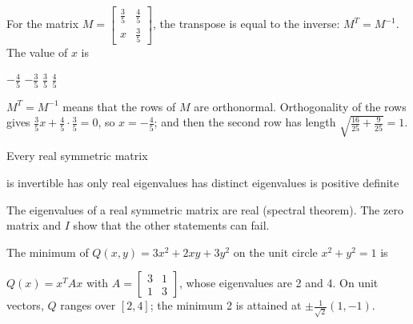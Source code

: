 \begin{question}[id=gate-me2009-1, source=GATE ME 2009]
For the matrix $M = \begin{bmatrix} \frac{3}{5} & \frac{4}{5} \\ x & \frac{3}{5} \end{bmatrix}$, the transpose is equal to the inverse: $M^T = M^{-1}$. The value of $x$ is
\begin{options}
  \correct $-\frac{4}{5}$
  \option $-\frac{3}{5}$
  \option $\frac{3}{5}$
  \option $\frac{4}{5}$
\end{options}
\begin{solution}
$M^T = M^{-1}$ means that the rows of $M$ are orthonormal. Orthogonality of the rows gives $\frac{3}{5}x + \frac{4}{5} \cdot \frac{3}{5} = 0$, so $x = -\frac{4}{5}$; and then the second row has length $\sqrt{\frac{16}{25} + \frac{9}{25}} = 1$.
\end{solution}
\end{question}


\begin{question}[id=sym-1]
Every real symmetric matrix
\begin{options}
  \option is invertible
  \correct has only real eigenvalues
  \option has distinct eigenvalues
  \option is positive definite
\end{options}
\begin{solution}
The eigenvalues of a real symmetric matrix are real (spectral theorem). The zero matrix and $I$ show that the other statements can fail.
\end{solution}
\end{question}

\begin{question}[id=sym-2, marks=2]
The minimum of $Q(x, y) = 3x^2 + 2xy + 3y^2$ on the unit circle $x^2 + y^2 = 1$ is
\begin{solution}
$Q(x) = x^TAx$ with $A = \begin{bmatrix} 3 & 1 \\ 1 & 3 \end{bmatrix}$, whose eigenvalues are 2 and 4. On unit vectors, $Q$ ranges over $[2, 4]$; the minimum 2 is attained at $\pm\tfrac{1}{\sqrt{2}}(1, -1)$.
\end{solution}
\end{question}

